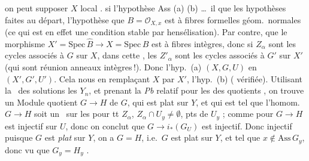 \documentclass[11pt,a4paper]{article}
\begin{document}


 on peut supposer $X$ local
 . \struck{\ill{}}
 si \ill{} \ill{} \ill{} 
\ill{} l'hypothèse \ill{} \ill{} Ass \ill{} 
 (a) (b) \ill{}
\ldots\ il  que les hypothèses faites au départ,
\struck{\ill{}} 
l'hypothèse que $B = \mathcal{O}_{X,x}$ est à fibres formelles
géom.\ normales (ce qui est en effet une condition stable par
hensélisation). Par contre, \ill{} \ill{} que le morphisme
$X' = \mathrm{Spec}\, \widehat{B} \to X = \mathrm{Spec}\, B$ est à
fibres   intègres, donc si $Z_\alpha$
sont les cycles associés à $G$ sur $X$,  dans cette
\ill{}, les $Z'_\alpha$ sont les cycles associés à $G'$ sur $X'$ (qui
sont réunion \ill{}  anneaux intègres\,!). Donc
l'hyp.\ (a) \ill{} \ill{} $(X, G, U)$ en $(X', G', U')$. Cela nous
 en remplaçant $X$ par $X'$, l'hyp.\ (b) 
 (\ill{} \ill{}  \ill{}
vérifiée). Utilisant la \ des solutions \ill{} les $Y_n$, et
prenant \ill{} la \ill{} \emph{Pb} relatif pour les \ill{} \ill{} des
 quotients , on trouve un Module
quotient $G \to H$ de $G$, qui est plat sur $Y$, et qui est \ill{}
\ill{} tel que l'homom.\ $G \to H$ soit un \ sur les \ill{}
\ill{} pour tt $Z_\alpha$, \ill{} $Z_\alpha \cap U_y \neq \emptyset$, \ill{}
pts de $U_y$ ; comme pour $G \to H$ est injectif sur $U$, donc on conclut
que $G \to i_*(G_U)$ est injectif. Donc injectif puisque $G$ est
\emph{plat} sur $Y$, on a $G = H$, i.e.\ $G$ est plat sur $Y$, et tel
que $x \notin \mathrm{Ass}\, G_y$, donc vu que $G_y = H_y$ \ill{}
\ill{} \ill{}.
\end{document}
